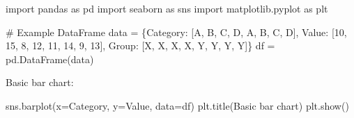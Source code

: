 \documentclass[
  english,
  letterpaper,
  DIV=11,
  numbers=noendperiod]{scrreprt}
\newenvironment{Shaded}{\begin{snugshade}}{\end{snugshade}}
\newcommand{\CommentTok}[1]{\textcolor[rgb]{0.37,0.37,0.37}{#1}}
\newcommand{\DecValTok}[1]{\textcolor[rgb]{0.68,0.00,0.00}{#1}}
\newcommand{\ImportTok}[1]{\textcolor[rgb]{0.00,0.46,0.62}{#1}}
\newcommand{\NormalTok}[1]{\textcolor[rgb]{0.00,0.23,0.31}{#1}}
\newcommand{\OperatorTok}[1]{\textcolor[rgb]{0.37,0.37,0.37}{#1}}
\newcommand{\StringTok}[1]{\textcolor[rgb]{0.13,0.47,0.30}{#1}}
\begin{document}
\begin{Shaded}
\begin{Highlighting}[]
\ImportTok{import}\NormalTok{ pandas }\ImportTok{as}\NormalTok{ pd}
\ImportTok{import}\NormalTok{ seaborn }\ImportTok{as}\NormalTok{ sns}
\ImportTok{import}\NormalTok{ matplotlib.pyplot }\ImportTok{as}\NormalTok{ plt}

\CommentTok{\# Example DataFrame}
\NormalTok{data }\OperatorTok{=}\NormalTok{ \{}\StringTok{\textquotesingle{}Category\textquotesingle{}}\NormalTok{: [}\StringTok{\textquotesingle{}A\textquotesingle{}}\NormalTok{, }\StringTok{\textquotesingle{}B\textquotesingle{}}\NormalTok{, }\StringTok{\textquotesingle{}C\textquotesingle{}}\NormalTok{, }\StringTok{\textquotesingle{}D\textquotesingle{}}\NormalTok{, }\StringTok{\textquotesingle{}A\textquotesingle{}}\NormalTok{, }\StringTok{\textquotesingle{}B\textquotesingle{}}\NormalTok{, }\StringTok{\textquotesingle{}C\textquotesingle{}}\NormalTok{, }\StringTok{\textquotesingle{}D\textquotesingle{}}\NormalTok{],}
        \StringTok{\textquotesingle{}Value\textquotesingle{}}\NormalTok{: [}\DecValTok{10}\NormalTok{, }\DecValTok{15}\NormalTok{, }\DecValTok{8}\NormalTok{, }\DecValTok{12}\NormalTok{, }\DecValTok{11}\NormalTok{, }\DecValTok{14}\NormalTok{, }\DecValTok{9}\NormalTok{, }\DecValTok{13}\NormalTok{],}
        \StringTok{\textquotesingle{}Group\textquotesingle{}}\NormalTok{: [}\StringTok{\textquotesingle{}X\textquotesingle{}}\NormalTok{, }\StringTok{\textquotesingle{}X\textquotesingle{}}\NormalTok{, }\StringTok{\textquotesingle{}X\textquotesingle{}}\NormalTok{, }\StringTok{\textquotesingle{}X\textquotesingle{}}\NormalTok{, }\StringTok{\textquotesingle{}Y\textquotesingle{}}\NormalTok{, }\StringTok{\textquotesingle{}Y\textquotesingle{}}\NormalTok{, }\StringTok{\textquotesingle{}Y\textquotesingle{}}\NormalTok{, }\StringTok{\textquotesingle{}Y\textquotesingle{}}\NormalTok{]\}}
\NormalTok{df }\OperatorTok{=}\NormalTok{ pd.DataFrame(data)}
\end{Highlighting}
\end{Shaded}

Basic bar chart:

\begin{Shaded}
\begin{Highlighting}[]
\NormalTok{sns.barplot(x}\OperatorTok{=}\StringTok{\textquotesingle{}Category\textquotesingle{}}\NormalTok{, y}\OperatorTok{=}\StringTok{\textquotesingle{}Value\textquotesingle{}}\NormalTok{, data}\OperatorTok{=}\NormalTok{df)}
\NormalTok{plt.title(}\StringTok{\textquotesingle{}Basic bar chart\textquotesingle{}}\NormalTok{)}
\NormalTok{plt.show()}
\end{Highlighting}
\end{Shaded}
\end{document}
